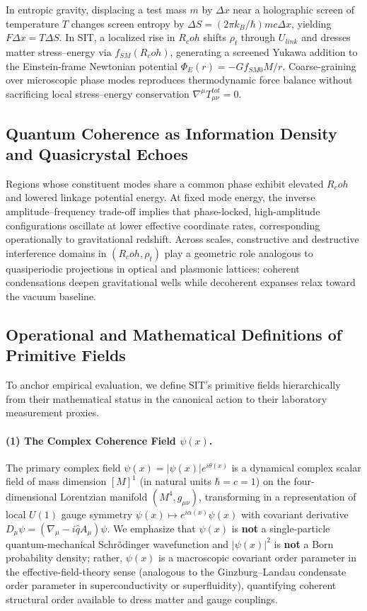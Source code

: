 \documentclass[american,11pt,letterpaper]{article}
\newcommand{\Rcoh}{R_{\mathrm{coh}}}
\def\mathcal#1{#1}%
\def\mathrm#1{#1}%
\def\Rcoh{R_coh}%
\begin{document}
In entropic gravity, displacing a test mass $m$ by $\Delta x$ near a holographic screen of temperature $T$ changes screen entropy by $\Delta S = (2\pi k_{\mathrm{B}}/\hbar) m c \Delta x$, yielding $F\Delta x = T\Delta S$. In SIT, a localized rise in $\Rcoh$ shifts $\rho_t$ through $U_{\mathrm{link}}$ and dresses matter stress--energy via $f_{\mathrm{SM}}(\Rcoh)$, generating a screened Yukawa addition to the Einstein-frame Newtonian potential $\Phi_E(r) = -G f_{\mathrm{SM}0} M / r$. Coarse-graining over microscopic phase modes reproduces thermodynamic force balance without sacrificing local stress--energy conservation $\nabla^\mu T^{\mathrm{tot}}_{\mu\nu} = 0$.

\subsection*{Quantum Coherence as Information Density and Quasicrystal Echoes}

Regions whose constituent modes share a common phase exhibit elevated $\Rcoh$ and lowered linkage potential energy. At fixed mode energy, the inverse amplitude--frequency trade-off implies that phase-locked, high-amplitude configurations oscillate at lower effective coordinate rates, corresponding operationally to gravitational redshift. Across scales, constructive and destructive interference domains in $(\Rcoh, \rho_t)$ play a geometric role analogous to quasiperiodic projections in optical and plasmonic lattices: coherent condensations deepen gravitational wells while decoherent expanses relax toward the vacuum baseline.

\subsection{Operational and Mathematical Definitions of Primitive Fields}
\label{sec:PrimitiveFieldDefinitions}
\label{sec:math}

To anchor empirical evaluation, we define SIT's primitive fields hierarchically from their mathematical status in the canonical action to their laboratory measurement proxies.

\paragraph{(1) The Complex Coherence Field $\psi(x)$.}
The primary complex field $\psi(x) = |\psi(x)| e^{i\theta(x)}$ is a dynamical complex scalar field of mass dimension $[M]^1$ (in natural units $\hbar = c = 1$) on the four-dimensional Lorentzian manifold $(\mathcal{M}^4, g_{\mu\nu})$, transforming in a representation of local $U(1)$ gauge symmetry $\psi(x) \mapsto e^{i\alpha(x)}\psi(x)$ with covariant derivative $D_\mu\psi = (\nabla_\mu - i\hat{q}A_\mu)\psi$. We emphasize that $\psi(x)$ is \textbf{not} a single-particle quantum-mechanical Schr\"odinger wavefunction and $|\psi(x)|^2$ is \textbf{not} a Born probability density; rather, $\psi(x)$ is a macroscopic covariant order parameter in the effective-field-theory sense (analogous to the Ginzburg--Landau condensate order parameter in superconductivity or superfluidity), quantifying coherent structural order available to dress matter and gauge couplings.
\end{document}
